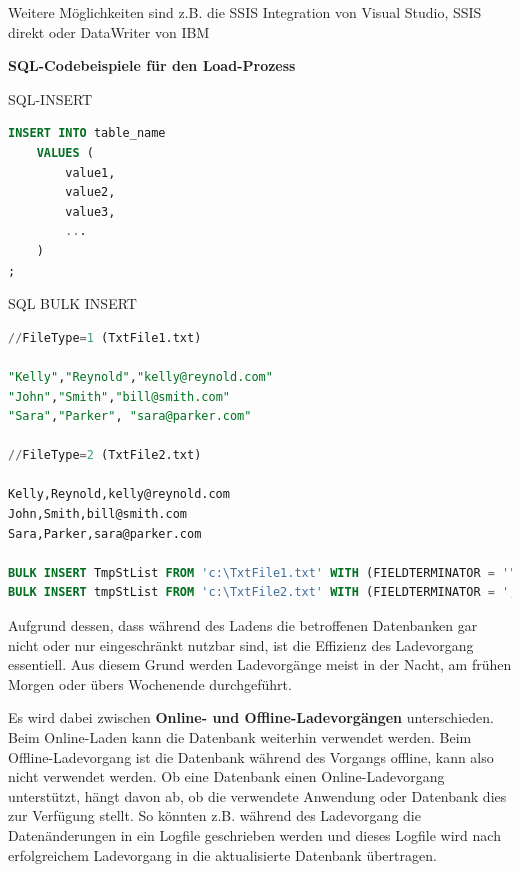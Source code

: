 \documentclass[a4paper, 11pt, nofootinbib]{article}
\begin{document}
\noindent 
Weitere Möglichkeiten sind z.B. die SSIS Integration von Visual Studio, SSIS direkt oder DataWriter von IBM

\vspace{10px}

\textbf{SQL-Codebeispiele für den Load-Prozess}

\vspace{10px}

\noindent SQL-INSERT

\begin{lstlisting}[language=SQL]
INSERT INTO table_name
	VALUES (
		value1,
		value2,
		value3,
		...
	)
; 
\end{lstlisting}

\noindent SQL BULK INSERT

\begin{lstlisting}[language=SQL]
//FileType=1 (TxtFile1.txt)

"Kelly","Reynold","kelly@reynold.com" 
"John","Smith","bill@smith.com" 
"Sara","Parker", "sara@parker.com"

//FileType=2 (TxtFile2.txt) 

Kelly,Reynold,kelly@reynold.com 
John,Smith,bill@smith.com 
Sara,Parker,sara@parker.com 

BULK INSERT TmpStList FROM 'c:\TxtFile1.txt' WITH (FIELDTERMINATOR = '","') 
BULK INSERT tmpStList FROM 'c:\TxtFile2.txt' WITH (FIELDTERMINATOR = ',')
\end{lstlisting}


\vspace{10px}

\noindent Aufgrund dessen, dass während des Ladens die betroffenen Datenbanken gar nicht oder nur eingeschränkt nutzbar sind, ist die Effizienz des Ladevorgang essentiell. Aus diesem Grund werden Ladevorgänge meist in der Nacht, am frühen Morgen oder übers Wochenende durchgeführt.

Es wird dabei zwischen \textbf{Online- und Offline-Ladevorgängen} unterschieden. Beim Online-Laden kann die Datenbank weiterhin verwendet werden. Beim Offline-Ladevorgang ist die Datenbank während des Vorgangs offline, kann also nicht verwendet werden. Ob eine Datenbank einen Online-Ladevorgang unterstützt, hängt davon ab, ob die verwendete Anwendung oder Datenbank dies zur Verfügung stellt. So könnten z.B. während des Ladevorgang die Datenänderungen in ein Logfile geschrieben werden und dieses Logfile wird nach erfolgreichem Ladevorgang in die aktualisierte Datenbank übertragen.
\end{document}

